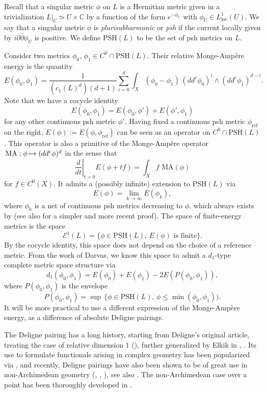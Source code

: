 \documentclass[JEP,XML,SOM,Unicode,NoEqCountersInSection,published]{cedram}
\def\mto{\mathchoice{\longmapsto}{\mapsto}{\mapsto}{\mapsto}}
\theoremstyle{definition}
\newcommand\bbc{\mathbb{C}}
\newcommand\cE{\mathcal{E}}
\newcommand\PSH{\mathrm{PSH}}
\newcommand\MA{\,\mathrm{MA}}
\newcommand\refmetric{\phi_{\mathrm{ref}}}
\begin{document}
Recall that a singular metric $\phi$ on $L$ is a Hermitian metric given in a trivialization $L|_U\simeq U\times \bbc$ by a function of the form $e^{-\phi_U}$ with $\phi_U\in L^1_{\mathrm{loc}}(U)$. We say that a singular metric $\phi$ is \textit{plurisubharmonic} or \textit{psh} if the current locally given by $i\partial\bar\partial \phi_U$ is positive. We define $\PSH(L)$ to be the set of psh metrics on $L$.

Consider two metrics $\phi_0$, $\phi_1\in C^0\cap \PSH(L)$. Their relative Monge-Ampère energy is the quantity
\[
E(\phi_0,\phi_1)=\frac{1}{(c_1(L)^d)(d+1)}\sum_{i=0}^{d}\int_X (\phi_0-\phi_1)\,(dd^c\phi_0)^i\wedge(dd^c\phi_1)^{d-i}.
\]
Note that we have a cocycle identity
\[
E(\phi_0,\phi_1)=E(\phi_0,\phi')+E(\phi',\phi_1)
\]
for any other continuous psh metric $\phi'$. Having fixed a continuous psh metric $\refmetric$ on the right, $E(\phi):=E(\phi,\refmetric)$ can be seen as an operator on $C^0\cap\PSH(L)$. This operator is also a primitive of the Monge-Ampère operator $\MA:\phi\mto (dd^c\phi)^d$ in the sense that
\[
\left.\frac{d}{dt}\right|_{t=0}E(\phi+tf)=\int_X f\,\MA(\phi)
\]
for $f\in C^0(X)$. It admits a (possibly infinite) extension to $\PSH(L)$ via
\[
E(\phi)=\lim_{k\to\infty}E(\phi_k),
\]
where $\phi_k$ is a net of continuous psh metrics decreasing to $\phi$, which always exists by \cite{demcurrents} (see also \cite{blockolo} for a simpler and more recent proof). The space of finite-energy metrics is the space
\[
\cE^1(L)=\{\phi\in \PSH(L),\,E(\phi)\text{ is finite}\}.
\]
By the cocycle identity, this space does not depend on the choice of a reference metric. From the work of Darvas, we know this space to admit a $d_1$-type complete metric space structure via
\[
d_1(\phi_0,\phi_1)=E(\phi_0)+E(\phi_1)-2E(P(\phi_0,\phi_1)),
\]
where $P(\phi_0,\phi_1)$ is the envelope
\[
P(\phi_0,\phi_1)=\sup\,\{\phi\in \PSH(L),\,\phi\leq\min(\phi_0,\phi_1)).
\]
It will be more practical to use a different expression of the Monge-Ampère energy, as a difference of absolute Deligne pairings.

\label{sect_deligne}

The Deligne pairing has a long history, starting from Deligne's original article, treating the case of relative dimension $1$ (\cite{deligne}), further generalized by Elkik in \cite{elkik1}, \cite{elkik2}. Its use to formulate functionals arising in complex geometry has been popularized via \cite{phongrosssturm}, and recently, Deligne pairings have also been shown to be of great use in non-Archimedean geometry (\cite{bhjasymptotics}, \cite{be20}, \cite[Rem.\,6]{phongrosssturm}), see also \cite{yz}. The non-Archimedean case over a point has been thoroughly developed in \cite{be20}.
\end{document}

